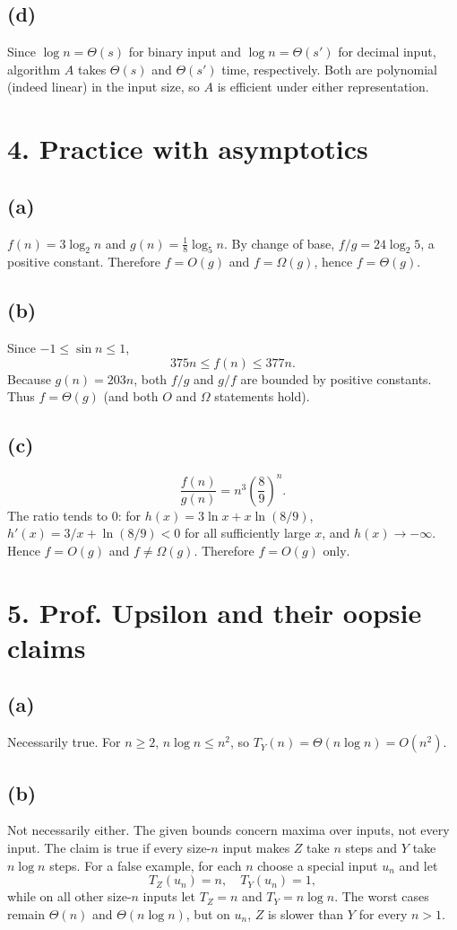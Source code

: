 \documentclass[11pt]{article}
\begin{document}
\subsection*{(d)} Since $\log n=\Theta(s)$ for binary input and $\log n=\Theta(s')$ for decimal input, algorithm $A$ takes $\boxed{\Theta(s)}$ and $\boxed{\Theta(s')}$ time, respectively.  Both are polynomial (indeed linear) in the input size, so $A$ is efficient under either representation.

\section*{4. Practice with asymptotics}
\subsection*{(a)}
$f(n)=3\log_2n$ and $g(n)=\frac18\log_5n$.  By change of base, $f/g=24\log_2 5$, a positive constant.  Therefore $f=O(g)$ and $f=\Omega(g)$, hence $\boxed{f=\Theta(g)}$.
\subsection*{(b)} Since $-1\le\sin n\le1$,
\[
375n\le f(n)\le377n.
\]
Because $g(n)=203n$, both $f/g$ and $g/f$ are bounded by positive constants.  Thus $\boxed{f=\Theta(g)}$ (and both $O$ and $\Omega$ statements hold).
\subsection*{(c)}
\[
\frac{f(n)}{g(n)}=n^3\left(\frac{8}{9}\right)^n.
\]
The ratio tends to $0$: for $h(x)=3\ln x+x\ln(8/9)$, $h'(x)=3/x+\ln(8/9)<0$ for all sufficiently large $x$, and $h(x)\to-\infty$.  Hence $f=O(g)$ and $f\ne\Omega(g)$.  Therefore $\boxed{f=O(g)\text{ only}}$.

\section*{5. Prof. Upsilon and their oopsie claims}
\subsection*{(a)} Necessarily true.  For $n\ge2$, $n\log n\le n^2$, so $T_Y(n)=\Theta(n\log n)=O(n^2)$.
\subsection*{(b)} Not necessarily either.  The given bounds concern maxima over inputs, not every input.  The claim is true if every size-$n$ input makes $Z$ take $n$ steps and $Y$ take $n\log n$ steps.  For a false example, for each $n$ choose a special input $u_n$ and let
\[
T_Z(u_n)=n,\quad T_Y(u_n)=1,
\]
while on all other size-$n$ inputs let $T_Z=n$ and $T_Y=n\log n$.  The worst cases remain $\Theta(n)$ and $\Theta(n\log n)$, but on $u_n$, $Z$ is slower than $Y$ for every $n>1$.
\end{document}
